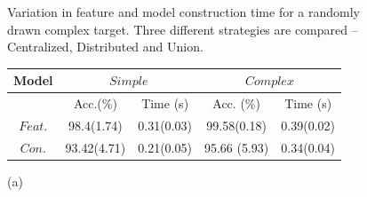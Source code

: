 \begin{description}
 \begin{figure}[h]
\centering
{
}
\caption{Variation in feature and model construction time for a randomly drawn complex target. Three different strategies are compared -- Centralized, Distributed and Union.}
\label{fig:complexUnion}
\end{figure}

\begin{figure}[htb]
\begin{center}
{\small{
\begin{tabular}{|c|c|c||c|c|}\hline
Model & \multicolumn{2}{|c||}{$Simple$} & \multicolumn{2}{|c|}{$Complex$}\\ \hline
         & Acc.(\%)   & Time (s)        & Acc. (\%)  & Time (s) \\ \cline{2-5}
$Feat.$ & 98.4(1.74) & 0.31(0.03)& 99.58(0.18)  & 0.39(0.02) \\
$Con.$ & 93.42(4.71) & 0.21(0.05)  & 95.66 (5.93)  & 0.34(0.04)\\ \hline
\end{tabular}
}}
\end{center}
\begin{center}
(a) 
\end{center}


\end{figure}
\end{description}
